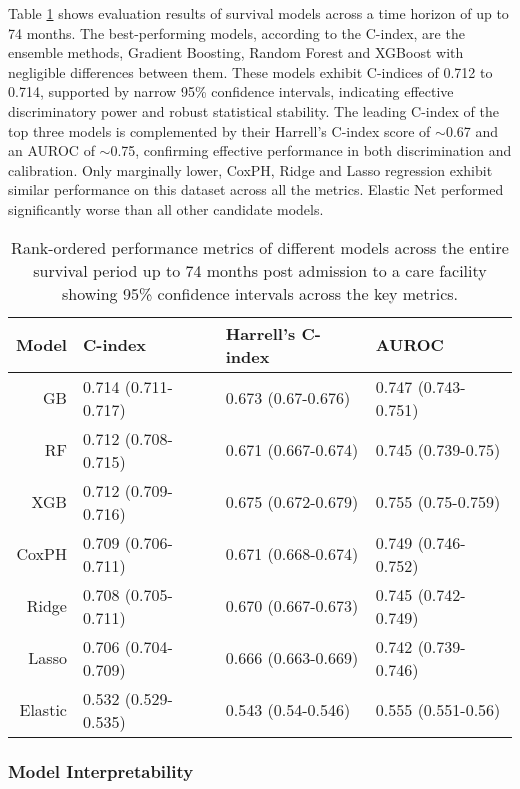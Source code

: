 \documentclass{article}
\begin{document}
Table \ref{tab:results} shows evaluation results of survival models across a time horizon of up to 74 months. The best-performing models, according to the C-index, are the ensemble methods, Gradient Boosting, Random Forest and XGBoost with negligible differences between them. These models exhibit C-indices of 0.712 to 0.714, supported by narrow 95\% confidence intervals, indicating effective discriminatory power and robust statistical stability. The leading C-index of the top three models is complemented by their Harrell's C-index score of $\sim$0.67 and an AUROC of $\sim$0.75, confirming effective performance in both discrimination and calibration. Only marginally lower, CoxPH, Ridge and Lasso regression exhibit similar performance on this dataset across all the metrics.  Elastic Net performed significantly worse than all other candidate models.


\begin{table}[hbt]
    \caption{Rank-ordered performance metrics of different models across the entire survival period up to 74 months post admission to a care facility showing 95\% confidence intervals across the key metrics.}
    \label{tab:results}
    \centering
    \begin{tabularx}{0.7\textwidth}{rXXX}
    \toprule
    Model & C-index & Harrell's C-index & AUROC \\
    \midrule
    GB & 0.714 (0.711-0.717) & 0.673 (0.67-0.676) & 0.747 (0.743-0.751) \\
    RF & 0.712 (0.708-0.715) & 0.671 (0.667-0.674) & 0.745 (0.739-0.75) \\
    XGB & 0.712 (0.709-0.716) & 0.675 (0.672-0.679) & 0.755 (0.75-0.759) \\
    CoxPH & 0.709 (0.706-0.711) & 0.671 (0.668-0.674) & 0.749 (0.746-0.752) \\
    Ridge & 0.708 (0.705-0.711) & 0.670 (0.667-0.673) & 0.745 (0.742-0.749) \\
    Lasso & 0.706 (0.704-0.709) & 0.666 (0.663-0.669) & 0.742 (0.739-0.746) \\
    Elastic & 0.532 (0.529-0.535) & 0.543 (0.54-0.546) & 0.555 (0.551-0.56) \\
    \bottomrule
    \end{tabularx}
\end{table}





\subsubsection*{Model Interpretability}
\end{document}
